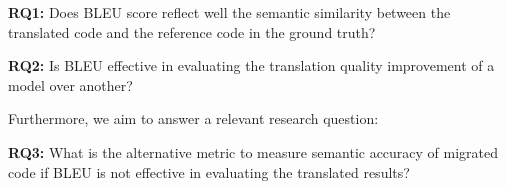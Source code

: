 {\bf RQ1:} Does BLEU score reflect well the semantic similarity between
the translated code and the reference code in the ground truth?

{\bf RQ2:} Is BLEU effective in evaluating the translation quality
improvement of a model over another?

Furthermore, we aim to answer a relevant research question:

{\bf RQ3:} What is the alternative metric to measure semantic accuracy
of migrated code if BLEU is not effective in evaluating the translated results?
